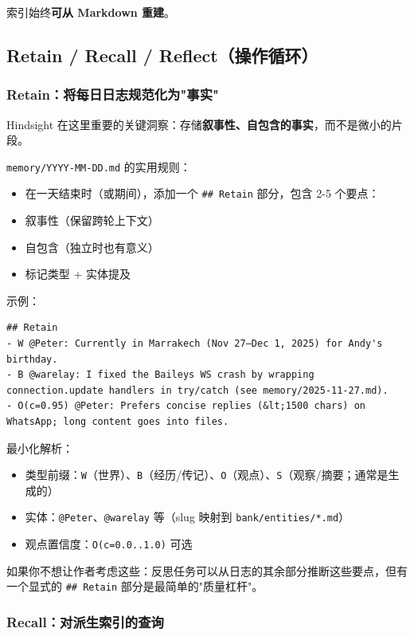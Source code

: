 索引始终\textbf{可从 Markdown 重建}。

\subsection{Retain / Recall / Reflect（操作循环）}


\subsubsection{Retain：将每日日志规范化为"事实"}


Hindsight 在这里重要的关键洞察：存储\textbf{叙事性、自包含的事实}，而不是微小的片段。

\texttt{memory/YYYY-MM-DD.md} 的实用规则：

\begin{itemize}
  \item 在一天结束时（或期间），添加一个 \texttt{\#\# Retain} 部分，包含 2-5 个要点：
  \item 叙事性（保留跨轮上下文）
  \item 自包含（独立时也有意义）
  \item 标记类型 + 实体提及
\end{itemize}


示例：

\begin{lstlisting}
## Retain
- W @Peter: Currently in Marrakech (Nov 27–Dec 1, 2025) for Andy's birthday.
- B @warelay: I fixed the Baileys WS crash by wrapping connection.update handlers in try/catch (see memory/2025-11-27.md).
- O(c=0.95) @Peter: Prefers concise replies (&lt;1500 chars) on WhatsApp; long content goes into files.
\end{lstlisting}


最小化解析：

\begin{itemize}
  \item 类型前缀：\texttt{W}（世界）、\texttt{B}（经历/传记）、\texttt{O}（观点）、\texttt{S}（观察/摘要；通常是生成的）
  \item 实体：\texttt{@Peter}、\texttt{@warelay} 等（slug 映射到 \texttt{bank/entities/*.md}）
  \item 观点置信度：\texttt{O(c=0.0..1.0)} 可选
\end{itemize}


如果你不想让作者考虑这些：反思任务可以从日志的其余部分推断这些要点，但有一个显式的 \texttt{\#\# Retain} 部分是最简单的"质量杠杆"。

\subsubsection{Recall：对派生索引的查询}



